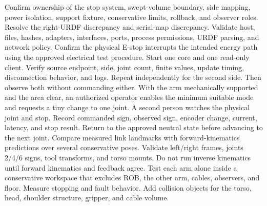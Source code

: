 {}
\markdownRendererSectionEnd \markdownRendererSectionBegin
{}\markdownRendererInterblockSeparator
{}\markdownRendererSectionBegin
{}\markdownRendererInterblockSeparator
{}Confirm ownership of the stop system, swept-volume boundary, side mapping, power isolation, support fixture, conservative limits, rollback, and observer roles. Resolve the right-URDF discrepancy and serial-map discrepancy.\markdownRendererInterblockSeparator
{}
\markdownRendererSectionEnd \markdownRendererSectionBegin
{}\markdownRendererInterblockSeparator
{}Validate host, files, hashes, adapters, interfaces, ports, process permissions, URDF parsing, and network policy. Confirm the physical E-stop interrupts the intended energy path using the approved electrical test procedure.\markdownRendererInterblockSeparator
{}
\markdownRendererSectionEnd \markdownRendererSectionBegin
{}\markdownRendererInterblockSeparator
{}Start one core and one read-only client. Verify source endpoint, side, joint count, finite values, update timing, disconnection behavior, and logs. Repeat independently for the second side. Then observe both without commanding either.\markdownRendererInterblockSeparator
{}
\markdownRendererSectionEnd \markdownRendererSectionBegin
{}\markdownRendererInterblockSeparator
{}With the arm mechanically supported and the area clear, an authorized operator enables the minimum suitable mode and requests a tiny change to one joint. A second person watches the physical joint and stop. Record commanded sign, observed sign, encoder change, current, latency, and stop result. Return to the approved neutral state before advancing to the next joint.\markdownRendererInterblockSeparator
{}
\markdownRendererSectionEnd \markdownRendererSectionBegin
{}\markdownRendererInterblockSeparator
{}Compare measured link landmarks with forward-kinematics predictions over several conservative poses. Validate left/right frames, joints 2/4/6 signs, tool transforms, and torso mounts. Do not run inverse kinematics until forward kinematics and feedback agree.\markdownRendererInterblockSeparator
{}
\markdownRendererSectionEnd \markdownRendererSectionBegin
{}\markdownRendererInterblockSeparator
{}Test each arm alone inside a conservative workspace that excludes ROB, the other arm, cables, observers, and floor. Measure stopping and fault behavior. Add collision objects for the torso, head, shoulder structure, gripper, and cable volume.\markdownRendererInterblockSeparator
